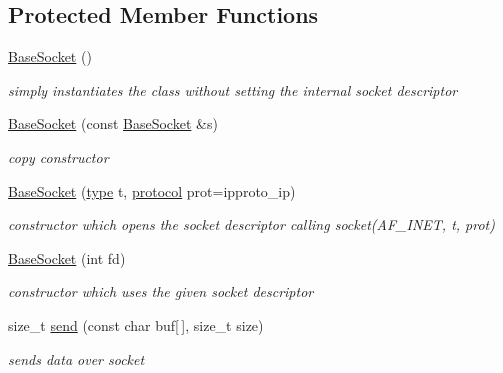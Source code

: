 \subsection*{Protected Member Functions}
\begin{CompactItemize}
\item 
\hyperlink{classsocketpp_1_1BaseSocket_3eb81ecbf94ce83afa6b2f60206c77f2}{BaseSocket} ()
\begin{CompactList}\small\item\em simply instantiates the class without setting the internal socket descriptor \item\end{CompactList}\item 
\hyperlink{classsocketpp_1_1BaseSocket_0c142db99422572579c91f3e176035c6}{BaseSocket} (const \hyperlink{classsocketpp_1_1BaseSocket}{BaseSocket} \&s)
\begin{CompactList}\small\item\em copy constructor \item\end{CompactList}\item 
\hyperlink{classsocketpp_1_1BaseSocket_35c982d7aef2041c100439cf38aa7f4d}{BaseSocket} (\hyperlink{namespacesocketpp_635f4c3b3f85aba331587404d59ae52d}{type} t, \hyperlink{namespacesocketpp_2969678def1c6c8cb4102802ca82e2cf}{protocol} prot=ipproto\_\-ip)
\begin{CompactList}\small\item\em constructor which opens the socket descriptor calling socket(AF\_\-INET, t, prot) \item\end{CompactList}\item 
\hyperlink{classsocketpp_1_1BaseSocket_f7e18d6700868abb2b476e797506eafb}{BaseSocket} (int fd)
\begin{CompactList}\small\item\em constructor which uses the given socket descriptor \item\end{CompactList}\item 
size\_\-t \hyperlink{classsocketpp_1_1BaseSocket_bf4e15b88271e34e606b9b2a5b384b5b}{send} (const char buf\mbox{[}$\,$\mbox{]}, size\_\-t size)
\begin{CompactList}\small\item\em sends data over socket \item\end{CompactList}\item 

\end{CompactItemize}
